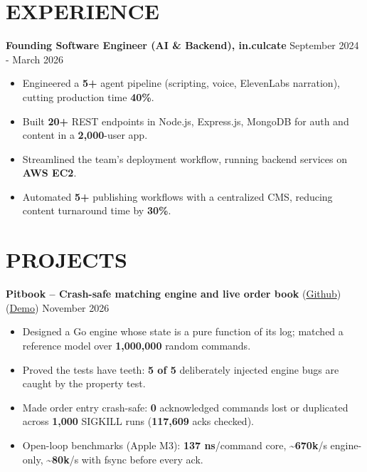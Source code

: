 
\section*{EXPERIENCE}
\textbf{Founding Software Engineer (AI \& Backend), in.culcate}  \hfill September 2024 - March 2026\\
\begin{itemize}[leftmargin=1.4em,itemsep=1pt,topsep=2pt,parsep=0pt]
  \item Engineered a \textbf{5+} agent pipeline (scripting, voice, ElevenLabs narration), cutting production time \textbf{40\%}.
  \item Built \textbf{20+} REST endpoints in Node.js, Express.js, MongoDB for auth and content in a \textbf{2,000}-user app.
  \item Streamlined the team's deployment workflow, running backend services on \textbf{AWS EC2}.
  \item Automated \textbf{5+} publishing workflows with a centralized CMS, reducing content turnaround time by \textbf{30\%}.
\end{itemize}

\section*{PROJECTS}
\textbf{Pitbook -- Crash-safe matching engine and live order book} (\href{https://github.com/pankajbaid567/pitbook}{Github}) (\href{https://pitbook.baidpankaj567.workers.dev}{Demo}) \hfill November 2026\\
\begin{itemize}[leftmargin=1.4em,itemsep=1pt,topsep=2pt,parsep=0pt]
  \item Designed a Go engine whose state is a pure function of its log; matched a reference model over \textbf{1,000,000} random commands.
  \item Proved the tests have teeth: \textbf{5 of 5} deliberately injected engine bugs are caught by the property test.
  \item Made order entry crash-safe: \textbf{0} acknowledged commands lost or duplicated across \textbf{1,000} SIGKILL runs (\textbf{117,609} acks checked).
  \item Open-loop benchmarks (Apple M3): \textbf{137 ns}/command core, \textbf{\textasciitilde{}670k}/s engine-only, \textbf{\textasciitilde{}80k}/s with fsync before every ack.
\end{itemize}

